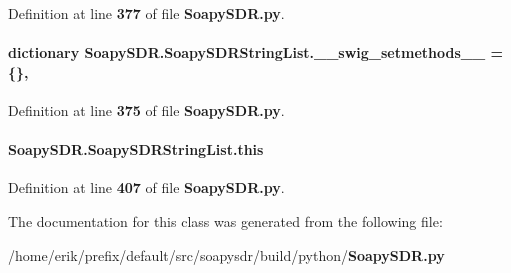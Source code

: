 Definition at line {\bf 377} of file {\bf Soapy\+S\+D\+R.\+py}.

\paragraph[{\+\_\+\+\_\+swig\+\_\+setmethods\+\_\+\+\_\+}]{\setlength{\rightskip}{0pt plus 5cm}dictionary Soapy\+S\+D\+R.\+Soapy\+S\+D\+R\+String\+List.\+\_\+\+\_\+swig\+\_\+setmethods\+\_\+\+\_\+ = \{\}\hspace{0.3cm}{\ttfamily [static]}, {\ttfamily [private]}}\label{classSoapySDR_1_1SoapySDRStringList_a95b8ae19be2e77f125bf59aebbda86e6}


Definition at line {\bf 375} of file {\bf Soapy\+S\+D\+R.\+py}.

\paragraph[{this}]{\setlength{\rightskip}{0pt plus 5cm}Soapy\+S\+D\+R.\+Soapy\+S\+D\+R\+String\+List.\+this}\label{classSoapySDR_1_1SoapySDRStringList_a2b3065c9cc16c253b23e5c10c87fb093}


Definition at line {\bf 407} of file {\bf Soapy\+S\+D\+R.\+py}.



The documentation for this class was generated from the following file\+:\begin{DoxyCompactItemize}
\item 
/home/erik/prefix/default/src/soapysdr/build/python/{\bf Soapy\+S\+D\+R.\+py}\end{DoxyCompactItemize}
